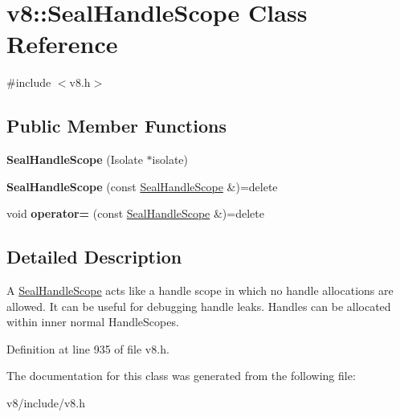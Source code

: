 \hypertarget{classv8_1_1SealHandleScope}{}\section{v8\+:\+:Seal\+Handle\+Scope Class Reference}
\label{classv8_1_1SealHandleScope}


{\ttfamily \#include $<$v8.\+h$>$}

\subsection*{Public Member Functions}
\begin{DoxyCompactItemize}
\item 
\mbox{\label{classv8_1_1SealHandleScope_acfdab75cc53b53d3ba1a50ab5f4fe16e}} 
{\bfseries Seal\+Handle\+Scope} (Isolate $\ast$isolate)
\item 
\mbox{\label{classv8_1_1SealHandleScope_a5e1f6e49a9aa67bb570437fa98097e75}} 
{\bfseries Seal\+Handle\+Scope} (const \mbox{\hyperlink{classv8_1_1SealHandleScope}{Seal\+Handle\+Scope}} \&)=delete
\item 
\mbox{\label{classv8_1_1SealHandleScope_a61b69e50f3996e315c4d3f41c1f67956}} 
void {\bfseries operator=} (const \mbox{\hyperlink{classv8_1_1SealHandleScope}{Seal\+Handle\+Scope}} \&)=delete
\end{DoxyCompactItemize}


\subsection{Detailed Description}
A \mbox{\hyperlink{classv8_1_1SealHandleScope}{Seal\+Handle\+Scope}} acts like a handle scope in which no handle allocations are allowed. It can be useful for debugging handle leaks. Handles can be allocated within inner normal Handle\+Scopes. 

Definition at line 935 of file v8.\+h.



The documentation for this class was generated from the following file\+:\begin{DoxyCompactItemize}
\item 
v8/include/v8.\+h\end{DoxyCompactItemize}
